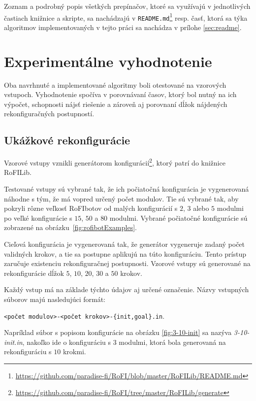 \documentclass[
  digital, %
  oneside, %
  notable,   %
  lof,     %
  nolot,     %
]{fithesis3}
\begin{document}
Zoznam a podrobný popis všetkých prepínačov, ktoré sa využívajú v jednotlivých častiach knižnice a skripte, sa nachádzajú v \texttt{README.md}\footnote{\url{https://github.com/paradise-fi/RoFI/blob/master/RoFILib/README.md}} resp. časť, ktorá sa týka algoritmov implementovaných v tejto práci sa nachádza v prílohe \ref{sec:readme}. 





\chapter{Experimentálne vyhodnotenie}
Oba navrhnuté a implementované algoritmy boli otestované na vzorových vstupoch. Vyhodnotenie spočíva v porovnávaní časov, ktorý bol nutný na ich výpočet, schopnosti nájsť riešenie a zároveň aj porovnaní dĺžok nájdených rekonfiguračných postupností. 

\section{Ukážkové rekonfigurácie}
Vzorové vstupy vznikli generátorom konfigurácií\footnote{\url{https://github.com/paradise-fi/RoFI/tree/master/RoFILib/generate}}, ktorý patrí do knižnice RoFILib. 

Testované vstupy sú vybrané tak, že ich počiatočná konfigurácia je vygenerovaná náhodne s tým, že má vopred určený počet modulov. Tie sú vybrané tak, aby pokryli rôzne veľkosť RoFIbotov od malých konfigurácií s $2$, $3$ alebo $5$ modulmi po veľké konfigurácie s $15$, $50$ a $80$ modulmi. Vybrané počiatočné konfigurácie sú zobrazené na obrázku~\ref{fig:rofibotExamples}. 

Cieľová konfigurácia je vygenerovaná tak, že generátor vygeneruje zadaný počet validných krokov, a tie sa postupne aplikujú na túto konfiguráciu. Tento prístup zaručuje existenciu rekonfiguračnej postupnosti. Vzorové vstupy sú generované na rekonfigurácie dĺžok $5$, $10$, $20$, $30$ a $50$ krokov. 

Každý vstup má na základe týchto údajov aj určené označenie. Názvy vstupných súborov majú nasledujúci formát:

\texttt{<počet modulov>-<počet krokov>-\{init,goal\}.in}. 

Napríklad súbor s popisom konfigurácie na obrázku \ref{fig:3-10-init} sa nazýva \textit{3-10-init.in}, nakoľko ide o konfiguráciu s $3$ modulmi, ktorá bola generovaná na rekonfiguráciu s $10$ krokmi. 
\end{document}
